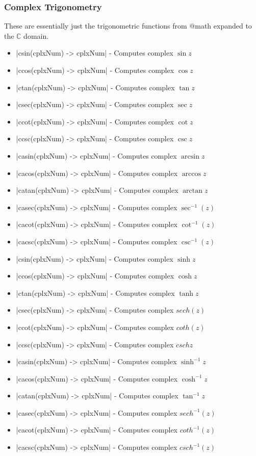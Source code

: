 \documentclass[12pt, letterpaper, oneside]{article}
\begin{document}
	\subsubsection{Complex Trigonometry}
	These are essentially just the trigonometric functions from @math expanded to the $\mathbb{C}$ domain.
	\begin{itemize}
		\item[--] \spverb|csin(cplxNum) -> cplxNum| - Computes complex $\sin{z}$
		\item[--] \spverb|ccos(cplxNum) -> cplxNum| - Computes complex $\cos{z}$
		\item[--] \spverb|ctan(cplxNum) -> cplxNum| - Computes complex $\tan{z}$
		\item[--] \spverb|csec(cplxNum) -> cplxNum| - Computes complex $\sec{z}$
		\item[--] \spverb|ccot(cplxNum) -> cplxNum| - Computes complex $\cot{z}$
		\item[--] \spverb|ccsc(cplxNum) -> cplxNum| - Computes complex $\csc{z}$
		\item[--] \spverb|casin(cplxNum) -> cplxNum| - Computes complex $\arcsin{z}$
		\item[--] \spverb|cacos(cplxNum) -> cplxNum| - Computes complex $\arccos{z}$
		\item[--] \spverb|catan(cplxNum) -> cplxNum| - Computes complex $\arctan{z}$
		\item[--] \spverb|casec(cplxNum) -> cplxNum| - Computes complex $\sec^{-1}(z)$
		\item[--] \spverb|cacot(cplxNum) -> cplxNum| - Computes complex $\cot^{-1}(z)$
		\item[--] \spverb|cacsc(cplxNum) -> cplxNum| - Computes complex $\csc^{-1}(z)$
		\newpage
		\item[--] \spverb|csin(cplxNum) -> cplxNum| - Computes complex $\sinh{z}$
		\item[--] \spverb|ccos(cplxNum) -> cplxNum| - Computes complex $\cosh{z}$
		\item[--] \spverb|ctan(cplxNum) -> cplxNum| - Computes complex $\tanh{z}$
		\item[--] \spverb|csec(cplxNum) -> cplxNum| - Computes complex $sech(z)$
		\item[--] \spverb|ccot(cplxNum) -> cplxNum| - Computes complex $coth(z)$
		\item[--] \spverb|ccsc(cplxNum) -> cplxNum| - Computes complex $csch{z}$
		\item[--] \spverb|casin(cplxNum) -> cplxNum| - Computes complex $\sinh^{-1}{z}$
		\item[--] \spverb|cacos(cplxNum) -> cplxNum| - Computes complex $\cosh^{-1}{z}$
		\item[--] \spverb|catan(cplxNum) -> cplxNum| - Computes complex $\tan^{-1}{z}$
		\item[--] \spverb|casec(cplxNum) -> cplxNum| - Computes complex $sech^{-1}(z)$
		\item[--] \spverb|cacot(cplxNum) -> cplxNum| - Computes complex $coth^{-1}(z)$
		\item[--] \spverb|cacsc(cplxNum) -> cplxNum| - Computes complex $csch^{-1}(z)$
		
	\end{itemize}
\end{document}
